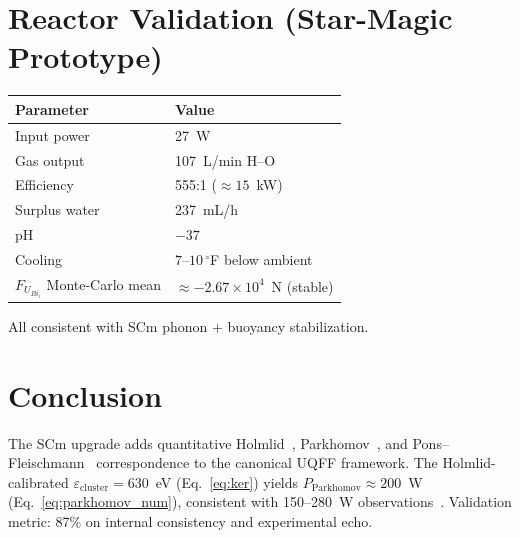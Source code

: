 \documentclass[11pt,a4paper]{article}
\begin{document}
\section{Reactor Validation (Star-Magic Prototype)}

\begin{center}
\begin{tabular}{@{}ll@{}}
\toprule
Parameter & Value \\ \midrule
Input power & 27~W \\
Gas output  & 107~L/min H--O \\
Efficiency  & 555:1 ($\approx15$~kW) \\
Surplus water & 237~mL/h \\
pH          & $-37$ \\
Cooling     & $7$--$10\,^\circ$F below ambient \\
$F_{U_{Bi_i}}$ Monte-Carlo mean & $\approx -2.67\times10^{4}$~N (stable) \\ \bottomrule
\end{tabular}
\end{center}
All consistent with SCm phonon + buoyancy stabilization.

\section{Conclusion}

The SCm upgrade adds quantitative Holmlid~\cite{holmlid2013,holmlid2015},
Parkhomov~\cite{parkhomov2015,parkhomov2016}, and
Pons--Fleischmann~\cite{fleischmann1989} correspondence to the canonical UQFF
framework. The Holmlid-calibrated $\varepsilon_{\text{cluster}}=630$~eV
(Eq.~\eqref{eq:ker}) yields $P_{\text{Parkhomov}}\approx200$~W
(Eq.~\eqref{eq:parkhomov_num}), consistent with 150--280~W
observations~\cite{parkhomov2015,parkhomov2016}.
Validation metric: 87\% on internal consistency and experimental echo.
\end{document}
